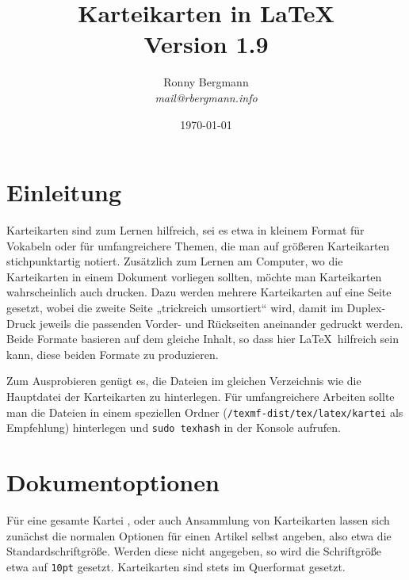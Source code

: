 \documentclass[a4paper,DIV=calc]{scrartcl}
\newcommand{\befehl}[1]{%
\marginpar{\footnotesize\textsf{#1}}%
}
\begin{document}
\title{Karteikarten in \LaTeX\\{\large Version 1.9}}
\author{Ronny Bergmann\\\emph{mail@rbergmann.info}}
\date{\today}
\maketitle
\section{Einleitung}
Karteikarten sind zum Lernen hilfreich, sei es etwa in kleinem Format für Vokabeln oder für umfangreichere Themen, die man auf größeren Karteikarten stichpunktartig notiert. Zusätzlich zum Lernen am Computer, wo die Karteikarten in einem Dokument vorliegen sollten, möchte man Karteikarten wahrscheinlich auch drucken. Dazu werden mehrere Karteikarten auf eine Seite gesetzt, wobei die zweite Seite „trickreich umsortiert“ wird, damit im Duplex-Druck jeweils die passenden Vorder- und Rückseiten aneinander gedruckt werden. Beide Formate basieren auf dem gleiche Inhalt, so dass hier \LaTeX\ hilfreich sein kann, diese beiden Formate zu produzieren.

Zum Ausprobieren genügt es, die Dateien im gleichen Verzeichnis wie die Hauptdatei der Karteikarten zu hinterlegen. Für umfangreichere Arbeiten sollte man die Dateien in einem speziellen Ordner (\lstinline!/texmf-dist/tex/latex/kartei! als Empfehlung) hinterlegen und \lstinline!sudo texhash! in der Konsole aufrufen.

\section{Dokumentoptionen}
Für eine gesamte Kartei \befehl{\textbackslash document-\\class\{kartei\}}, oder auch Ansammlung von Karteikarten lassen sich zunächst die normalen Optionen für einen Artikel selbst angeben, also etwa die Standardschriftgröße. Werden diese nicht angegeben, so wird die Schriftgröße etwa auf \lstinline!10pt! gesetzt. Karteikarten sind stets im Querformat gesetzt.
\end{document}
